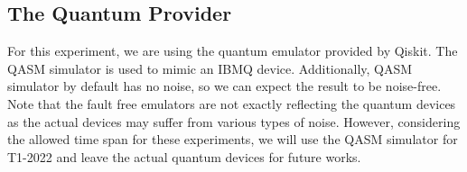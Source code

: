 \subsection{The Quantum Provider}
For this experiment, we are using the quantum emulator provided by Qiskit.
The QASM simulator is used to mimic an IBMQ device.
Additionally, QASM simulator by default has no noise, so we can expect the result to be noise-free.
Note that the fault free emulators are not exactly reflecting the quantum devices as the actual devices may suffer from various types of noise.
However, considering the allowed time span for these experiments, we will use the QASM simulator for T1-2022 and leave the actual quantum devices for future works.